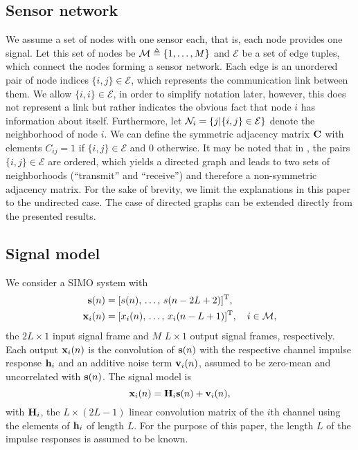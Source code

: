 \documentclass{article}
\begin{document}
\subsection[]{Sensor network}
We assume a set of nodes with one sensor each, that is, each node provides one signal.
Let this set of nodes be \(\mathcal{M} \triangleq \{1,\ldots,M\}\) and \(\mathcal{E}\) be a set of edge tuples, which connect the nodes forming a sensor network.
Each edge is an unordered pair of node indices \(\{i,j\} \in \mathcal{E}\), which represents the communication link between them.
We allow \(\{i,i\} \in \mathcal{E}\), in order to simplify notation later, however, this does not represent a link but rather indicates the obvious fact that node \(i\) has information about itself.
Furthermore, let \(\mathcal{N}_i = \{j|\{i,j\} \in \mathcal{E}\}\) denote the neighborhood of node \(i\).
We can define the symmetric adjacency matrix \(\bm{\mathrm{C}}\) with elements \(C_{ij} = 1\) if \(\{i,j\} \in \mathcal{E}\) and 0 otherwise.
It may be noted that in \cite{blochbergerDBSI}, the pairs \(\{i,j\} \in \mathcal{E}\) are ordered, which yields a directed graph and leads to two sets of neighborhoods (``transmit'' and ``receive'') and therefore a non-symmetric adjacency matrix.
For the sake of brevity, we limit the explanations in this paper to the undirected case.
The case of directed graphs can be extended directly from the presented results.

\subsection[]{Signal model}
We consider a SIMO system with
\begin{align}
    \bm{\mathrm{s}}(n) &= [s(n),\,\ldots,\,s(n-2L+2)]^{{\mathrm{T}}},\\
    \bm{\mathrm{x}}_i(n) &= [x_i(n),\,\ldots,\,x_i(n-L+1)]^{{\mathrm{T}}}, \quad i \in \mathcal{M},
\end{align}
the \(2L \times 1\) input signal frame and \(M\) \(L \times 1\)  output signal frames, respectively.
Each output \(\bm{\mathrm{x}}_i(n)\) is the convolution of \(\bm{\mathrm{s}}(n)\) with the respective channel impulse response \(\bm{\mathrm{h}}_i\) and an additive noise term \(\bm{\mathrm{v}}_i(n)\), assumed to be zero-mean and uncorrelated with \(\bm{\mathrm{s}}(n)\).
The signal model is
\begin{equation}
    \bm{\mathrm{x}}_i(n) = \bm{\mathrm{H}}_i \bm{\mathrm{s}}(n) + \bm{\mathrm{v}}_i(n),
\end{equation}
with \(\bm{\mathrm{H}}_i\), the \(L \times (2L-1)\) linear convolution matrix of the \(i\)th channel using the elements of \(\bm{\mathrm{h}}_i\) of length \(L\).
For the purpose of this paper, the length \(L\) of the impulse responses is assumed to be known.
\end{document}

